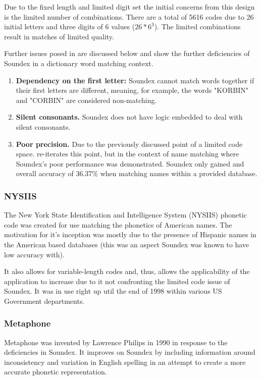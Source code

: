 Due to the fixed length and limited digit set the initial concerns from this design is the limited number of combinations. There are a total of 5616 codes due to 26 initial letters and three digits of 6 values ($26 * 6^3$).
The limited combinations result in matches of limited quality.

Further issues posed in \cite{patman2001soundex} are discussed below and show the further deficiencies of Soundex in a dictionary word matching context. 

\begin{enumerate}
    \item \textbf{Dependency on the first letter:} Soundex cannot match words together if their first letters are different, meaning, for example, the words "KORBIN" and "CORBIN" are considered non-matching. 

    \item \textbf{Silent consonants.} Soundex does not have logic embedded to deal with silent consonants.

    \item \textbf{Poor precision.} Due to the previously discussed point of a limited code space. \cite{patman2001soundex} re-iterates this point, but in the context of name matching where Soundex's poor performance was demonstrated. Soundex only gained and overall accuracy of 36.37\% when matching names within a provided database.
\end{enumerate}

\subsubsection*{NYSIIS}
\label{sec:nysiis}
The New York State Identification and Intelligence System (NYSIIS) phonetic code was created for use matching the phonetics of American names. The motivation for it's inception was mostly due to the presence of Hispanic names in the American based databases (this was an aspect Soundex was known to have low accuracy with). 

It also allows for variable-length codes and, thus, allows the applicability of the application to increase due to it not confronting the limited code issue of Soundex. It was in use right up util the end of 1998 within various US Government departments.

\subsubsection*{Metaphone}
\label{sec:metaphone}
Metaphone was invented by Lawrence Philips in 1990\cite{philips1990hanging} in response to the deficiencies in Soundex. It improves on Soundex by including information around inconsistency and variation in English spelling in an attempt to create a more accurate phonetic representation.

